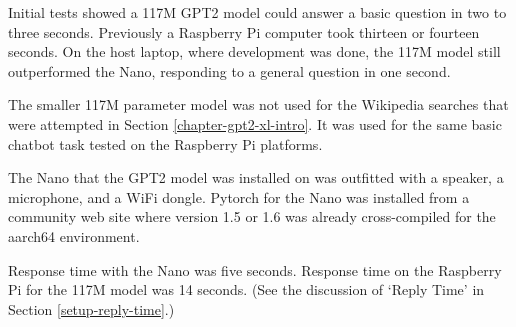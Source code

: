 Initial tests showed a 117M GPT2 model could answer a basic question in two to three seconds. Previously a Raspberry Pi computer took thirteen or fourteen seconds. On the host laptop, where development was done, the 117M model still outperformed the Nano, responding to a general question in one second.

The smaller 117M parameter model was not used for the Wikipedia searches that were attempted in Section \ref{chapter-gpt2-xl-intro}. It was used for the same basic chatbot task tested on the Raspberry Pi platforms.


The Nano that the GPT2 model was installed on was outfitted with a speaker, a microphone, and a WiFi dongle. Pytorch for the Nano was installed from a community web site where version 1.5 or 1.6 was already cross-compiled for the aarch64 environment. 

Response time with the Nano was five seconds. Response time on the Raspberry Pi for the 117M model was 14 seconds. (See the discussion of `Reply Time' in Section \ref{setup-reply-time}.)
